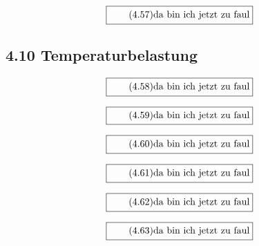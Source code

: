 \documentclass[11pt]{article}
\newcommand{\1}{ {\mathds{1}} }
\begin{document}
    \begin{equation}
      \boxed{
        \tag{4.57}
        \begin{split}
          \text{da bin ich jetzt zu faul}
        \end{split}
      }
    \end{equation}
    \subsection*{4.10 Temperaturbelastung}

    \begin{equation}
      \boxed{
        \tag{4.58}
        \begin{split}
          \text{da bin ich jetzt zu faul}
        \end{split}
      }
    \end{equation}
    
    \begin{equation}
      \boxed{
        \tag{4.59}
        \begin{split}
          \text{da bin ich jetzt zu faul}
        \end{split}
      }
    \end{equation}

    \begin{equation}
      \boxed{
        \tag{4.60}
        \begin{split}
          \text{da bin ich jetzt zu faul}
        \end{split}
      }
    \end{equation}

    \begin{equation}
      \boxed{
        \tag{4.61}
        \begin{split}
          \text{da bin ich jetzt zu faul}
        \end{split}
      }
    \end{equation}

    \begin{equation}
      \boxed{
        \tag{4.62}
        \begin{split}
          \text{da bin ich jetzt zu faul}
        \end{split}
      }
    \end{equation}
    
    \begin{equation}
      \boxed{
        \tag{4.63}
        \begin{split}
          \text{da bin ich jetzt zu faul}
        \end{split}
      }
    \end{equation}
\end{document}
